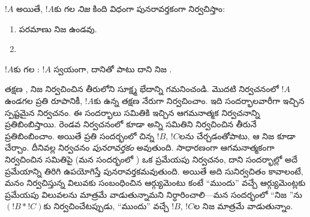 \documentclass[../../../include/open-logic-section]{subfiles}
\begin{document}
\begin{defn}
$!A$  అయితే, $!A$కు గల \emph{నిజ }
కింది విధంగా పునరావర్తకంగా నిర్వచిస్తాం:
\begin{enumerate}
\item పరమాణు  నిజ  ఉండవు.


\item {}


\end{enumerate}
\end{defn}

\begin{defn}
$!A$కు గల : $!A$ స్వయంగా, దానితో పాటు దాని నిజ
.
\end{defn}

\begin{explain}
తక్షణ , నిజ  నిర్వచించిన తీరులోని
సూక్ష్మ భేదాన్ని గమనించండి. మొదటి నిర్వచనంలో $!A$ ఉండగల ప్రతి
రూపానికీ, $!A$కు ఉన్న తక్షణ  నేరుగా నిర్వచించాం. ఇది
సందర్భాలవారీగా ఇచ్చిన స్పష్టమైన నిర్వచనం. ఈ సందర్భాలు  సమితికి ఇచ్చిన
ఆగమనాత్మక నిర్వచనాన్ని ప్రతిబింబిస్తాయి. రెండవ నిర్వచనంలో కూడా అన్ని
 సమితిని నిర్వచించిన తీరునే ప్రతిబింబించాం. అయితే ప్రతి
సందర్భంలో చిన్న  $!B$, $!C$లను చేర్చడంతోపాటు,
ఆ  నిజ  కూడా చేర్చాం. దీనివల్ల నిర్వచనం \emph{పునరావర్తకం}
అవుతుంది. సాధారణంగా ఆగమనాత్మకంగా నిర్వచించిన సమితిపై (మన సందర్భంలో
) ఒక ప్రమేయపు నిర్వచనం, దాని సందర్భాల్లో అదే ప్రమేయాన్ని
తిరిగి ఉపయోగిస్తే పునరావర్తకమవుతుంది. అయితే అది సునిర్వచితం కావాలంటే,
మనం నిర్వచిస్తున్న విలువకు సంబంధించిన ఆర్గ్యుమెంటు కంటే ``ముందు'' వచ్చే ఆర్గ్యుమెంట్లకు
ప్రమేయపు విలువలను మాత్రమే వాడుతున్నామని నిర్ధారించాలి---మన సందర్భంలో
``నిజ ''ను $(!B \ast !C)$కు నిర్వచించేటప్పుడు, ``ముందు'' వచ్చే
 $!B$, $!C$ల నిజ  మాత్రమే వాడుతున్నాం.
\end{explain}
\end{document}
